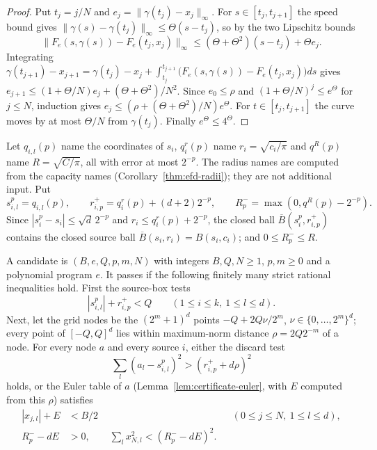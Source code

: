 \begin{proof}
Put $t_j=j/N$ and $e_j=\|\gamma(t_j)-x_j\|_\infty$. For $s\in[t_j,t_{j+1}]$ the speed bound gives
$\|\gamma(s)-\gamma(t_j)\|_\infty\le\Theta(s-t_j)$, so by the two Lipschitz bounds
\[
 \|F_e(s,\gamma(s))-F_e(t_j,x_j)\|_\infty\le(\Theta+\Theta^2)(s-t_j)+\Theta e_j .
\]
Integrating $\gamma(t_{j+1})-x_{j+1}=\gamma(t_j)-x_j+\int_{t_j}^{t_{j+1}}\bigl(F_e(s,\gamma(s))-F_e(t_j,x_j)\bigr)ds$
gives $e_{j+1}\le(1+\Theta/N)e_j+(\Theta+\Theta^2)/N^2$. Since $e_0\le\rho$ and $(1+\Theta/N)^j\le e^\Theta$ for
$j\le N$, induction gives $e_j\le(\rho+(\Theta+\Theta^2)/N)e^\Theta$. For $t\in[t_j,t_{j+1}]$ the curve moves by at most
$\Theta/N$ from $\gamma(t_j)$. Finally $e^\Theta\le4^\Theta$.
\end{proof}

Let $q_{i,l}(p)$ name the coordinates of $s_i$, $q_i^r(p)$ name $r_i=\sqrt{c_i/\pi}$ and $q^R(p)$ name
$R=\sqrt{C/\pi}$, all with error at most $2^{-p}$. The radius names are computed from the capacity names
(Corollary~\ref{thm:efd-radii}); they are not additional input. Put
\begin{equation}\label{eq:certificate-enclosures}
 s^p_{i,l}=q_{i,l}(p),\qquad
 r^+_{i,p}=q_i^r(p)+(d+2)2^{-p},\qquad
 R^-_p=\max(0,q^R(p)-2^{-p}).
\end{equation}
Since $|s_i^p-s_i|\le\sqrt d\,2^{-p}$ and $r_i\le q_i^r(p)+2^{-p}$, the closed ball $\overline B(s_i^p,r^+_{i,p})$
contains the closed source ball $\overline B(s_i,r_i)=B(s_i,c_i)$; and $0\le R^-_p\le R$.

\begin{definition}\label{def:certificate-checks}
A candidate is $(B,e,Q,p,m,N)$ with integers $B,Q,N\ge1$, $p,m\ge0$ and a polynomial program $e$. It passes if the
following finitely many strict rational inequalities hold. First the source-box tests
\[
 |s^p_{i,l}|+r^+_{i,p}<Q\qquad(1\le i\le k,\ 1\le l\le d).
\]
Next, let the grid nodes be the $(2^m+1)^d$ points $-Q+2Q\nu/2^m$, $\nu\in\{0,\dots,2^m\}^d$; every point of
$[-Q,Q]^d$ lies within maximum-norm distance $\rho=2Q2^{-m}$ of a node. For every node $a$ and every source $i$,
either the discard test
\begin{equation}\label{eq:certificate-discard}
 \sum_l(a_l-s^p_{i,l})^2>(r^+_{i,p}+d\rho)^2
\end{equation}
holds, or the Euler table of $a$ (Lemma~\ref{lem:certificate-euler}, with $E$ computed from this $\rho$) satisfies
\begin{align}
 |x_{j,l}|+E&<B/2 &&(0\le j\le N,\ 1\le l\le d),\label{eq:certificate-plateau}\\
 R^-_p-dE&>0,\qquad
 \sum_l x_{N,l}^2<(R^-_p-dE)^2.\label{eq:certificate-target}
\end{align}
\end{definition}


